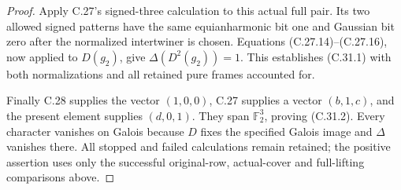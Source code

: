 \begin{proof}
Apply C.27's signed-three calculation to this actual full pair.
Its two allowed signed patterns have the same equianharmonic bit
one and Gaussian bit zero after the normalized intertwiner is
chosen. Equations (C.27.14)--(C.27.16), now applied to $D(g_2)$,
give $\Delta(D^2(g_2))=1$. This establishes (C.31.1) with both
normalizations and all retained pure frames accounted for.

Finally C.28 supplies the vector $(1,0,0)$, C.27 supplies a vector
$(b,1,c)$, and the present element supplies $(d,0,1)$. They span
$\mathbb F_2^3$, proving (C.31.2). Every character vanishes on
Galois because $D$ fixes the specified Galois image and $\Delta$
vanishes there. All stopped and failed calculations remain retained;
the positive assertion uses only the successful original-row,
actual-cover and full-lifting comparisons above.
\end{proof}
